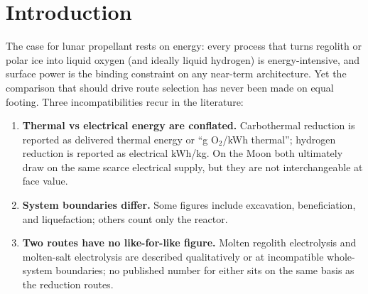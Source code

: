 \documentclass[11pt,a4paper]{article}
\begin{document}
\begin{abstract}
Monte Carlo that shares common parameters across routes, we report dominance probabilities
rather than overlapping error bars. The central finding is that \textbf{on an all-electric
basis the polar water-ice route is the most energy-efficient (cheapest in 89\% of paired
trials) and the only route that yields a complete LOX+LH$_2$ propellant}, though its margin
narrows once it is charged for capture, excavation, and standing loss: water ($\sim$16
kWh/kg O$_2$) versus a high-temperature cluster at $\sim$21--32, with hydrogen reduction the
most likely worst once its standing loss is charged. The advantage is structural: water
mining is the only low-temperature route (sublimation at $\sim$273 K), so it escapes the
large, continuous reactor heat-loss penalty ($\sim$63--93 kWh-thermal/kg O$_2$ in the one
measured carbothermal demonstration) that burdens every high-temperature thermochemical or
electrochemical route. The result is, however, conditional on heat being electrically
supplied: a solar-thermal sensitivity shows that concentrated sunlight at a sunlit site
inverts the ranking (carbothermal falls to $\sim$8 kWh-electric/kg O$_2$), at the cost of
concentrator mass and of being at the wrong site for water. A sensitivity analysis
identifies the single highest-value measurement for each route, we translate energy into
required surface power and landed fission-plant mass, and we outline two companion analyses
on reusing co-located compute waste heat (which is, fittingly, most useful precisely at the
low-temperature water route).
\end{abstract}

\section{Introduction}

The case for lunar propellant rests on energy: every process that turns regolith or
polar ice into liquid oxygen (and ideally liquid hydrogen) is energy-intensive, and
surface power is the binding constraint on any near-term architecture. Yet the
comparison that should drive route selection has never been made on equal footing.
Three incompatibilities recur in the literature:

\begin{enumerate}
  \item \textbf{Thermal vs electrical energy are conflated.} Carbothermal reduction is
    reported as delivered thermal energy or ``g O$_2$/kWh thermal''; hydrogen reduction
    is reported as electrical kWh/kg. On the Moon both ultimately draw on the same
    scarce electrical supply, but they are not interchangeable at face value.
  \item \textbf{System boundaries differ.} Some figures include excavation,
    beneficiation, and liquefaction; others count only the reactor.
  \item \textbf{Two routes have no like-for-like figure.} Molten regolith electrolysis
    and molten-salt electrolysis are described qualitatively or at incompatible
    whole-system boundaries; no published number for either sits on the same basis as
    the reduction routes.
\end{enumerate}
\end{document}
